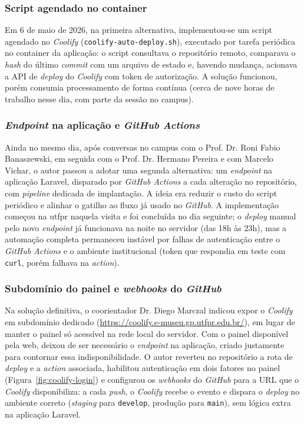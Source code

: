 \subsubsection{Script agendado no container}\label{sec:dev-deploy-cron}

Em 6 de maio de 2026, na primeira alternativa, implementou-se um script agendado no \textit{Coolify} (\texttt{coolify-auto-deploy.sh}), executado por tarefa periódica no container da aplicação: o script consultava o repositório remoto, comparava o \textit{hash} do último \textit{commit} com um arquivo de estado e, havendo mudança, acionava a API de \textit{deploy} do \textit{Coolify} com token de autorização. A solução funcionou, porém consumia processamento de forma contínua (cerca de nove horas de trabalho nesse dia, com parte da sessão no campus).


\subsubsection{\textit{Endpoint} na aplicação e \textit{GitHub Actions}}\label{sec:dev-deploy-endpoint}

Ainda no mesmo dia, após conversas no campus com o Prof. Dr. Roni Fabio Banaszewski, em seguida com o Prof. Dr. Hermano Pereira e com Marcelo Vichar, o autor passou a adotar uma segunda alternativa: um \textit{endpoint} na aplicação Laravel, disparado por \textit{GitHub Actions} a cada alteração no repositório, com \textit{pipeline} dedicada de implantação. A ideia era reduzir o custo do script periódico e alinhar o gatilho ao fluxo já usado no \textit{GitHub}. A implementação começou na \acrshort{utfpr} naquela visita e foi concluída no dia seguinte; o \textit{deploy} manual pelo novo \textit{endpoint} já funcionava na noite no servidor (das 18h às 23h), mas a automação completa permaneceu instável por falhas de autenticação entre o \textit{GitHub Actions} e o ambiente institucional (token que respondia em teste com \texttt{curl}, porém falhava na \textit{action}).


\subsubsection{Subdomínio do painel e \textit{webhooks} do \textit{GitHub}}\label{sec:dev-deploy-webhooks}

Na solução definitiva, o coorientador Dr. Diego Marczal indicou expor o \textit{Coolify} em subdomínio dedicado (\url{https://coolify.e-museu.gp.utfpr.edu.br/}), em lugar de manter o painel só acessível na rede local do servidor. Com o painel disponível pela web, deixou de ser necessário o \textit{endpoint} na aplicação, criado justamente para contornar essa indisponibilidade. O autor reverteu no repositório a rota de \textit{deploy} e a \textit{action} associada, habilitou autenticação em dois fatores no painel (Figura~\ref{fig:coolify-login}) e configurou os \textit{webhooks} do \textit{GitHub} para a URL que o \textit{Coolify} disponibiliza: a cada \textit{push}, o \textit{Coolify} recebe o evento e dispara o \textit{deploy} no ambiente correto (\textit{staging} para \texttt{develop}, produção para \texttt{main}), sem lógica extra na aplicação Laravel.


